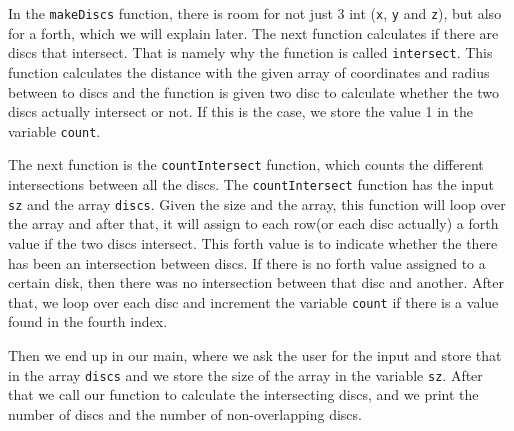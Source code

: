 \documentclass[a4paper,10pt]{article}
\begin{document}
In the {\tt makeDiscs} function, there is room for not just 3 int ({\tt x}, {\tt y} and {\tt z}), but also for a forth, which we will explain later. The next function calculates if there are discs that intersect. That is namely why the function is called {\tt intersect}. This function calculates the distance with the given array of coordinates and radius between to discs and the function is given two disc to calculate whether the two discs actually intersect or not. If this is the case, we store the value 1 in the variable {\tt count}. 

The next function is the {\tt countIntersect} function, which counts the different intersections between all the discs. The {\tt countIntersect} function has the input {\tt sz} and the array {\tt discs}. Given the size and the array, this function will loop over the array and after that, it will assign to each row(or each disc actually) a forth value if the two discs intersect. This forth value is to indicate whether the there has been an intersection between discs. If there is no forth value assigned to a certain disk, then there was no intersection between that disc and another. After that, we loop over each disc and increment the variable {\tt count} if there is a value found in the fourth index.

Then we end up in our main, where we ask the user for the input and store that in the array {\tt discs} and we store the size of the array in the variable {\tt sz}. After that we call our function to calculate the intersecting discs, and we print the number of discs and the number of non-overlapping discs. 
\end{document}
